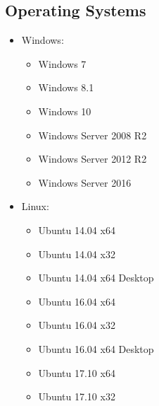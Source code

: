 \documentclass[openright]{report}
\begin{document}
\begin{appendices}
\chapter{Operating Systems}
\label{appendix:os}
\begin{itemize}
    \item Windows:
    \begin{itemize}
        \item Windows 7
        \item Windows 8.1
        \item Windows 10
        \item Windows Server 2008 R2
        \item Windows Server 2012 R2
        \item Windows Server 2016
    \end{itemize}
    \item Linux:
    \begin{itemize}
        \item Ubuntu 14.04 x64
        \item Ubuntu 14.04 x32
        \item Ubuntu 14.04 x64 Desktop
        \item Ubuntu 16.04 x64
        \item Ubuntu 16.04 x32
        \item Ubuntu 16.04 x64 Desktop
        \item Ubuntu 17.10 x64
        \item Ubuntu 17.10 x32
    \end{itemize}
\end{itemize}

\end{appendices}






\listoffigures
\cleardoublepage
\end{document}
